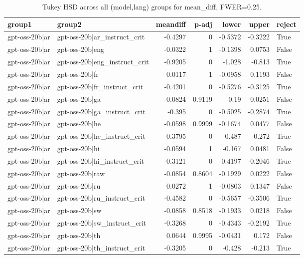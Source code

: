 \begin{table}
\caption{Tukey HSD across all (model,lang) groups for mean_diff, FWER=0.25.}
\label{tab:tukey_all_models_all_langs_mean_diff}
\begin{tabular}{l l r r r r l}
\toprule
group1 & group2 & meandiff & p-adj & lower & upper & reject \\
\midrule
gpt-oss-20b|ar & gpt-oss-20b|ar_instruct_crit & -0.4297 & 0 & -0.5372 & -0.3222 & True \\
gpt-oss-20b|ar & gpt-oss-20b|eng & -0.0322 & 1 & -0.1398 & 0.0753 & False \\
gpt-oss-20b|ar & gpt-oss-20b|eng_instruct_crit & -0.9205 & 0 & -1.028 & -0.813 & True \\
gpt-oss-20b|ar & gpt-oss-20b|fr & 0.0117 & 1 & -0.0958 & 0.1193 & False \\
gpt-oss-20b|ar & gpt-oss-20b|fr_instruct_crit & -0.4201 & 0 & -0.5276 & -0.3125 & True \\
gpt-oss-20b|ar & gpt-oss-20b|ga & -0.0824 & 0.9119 & -0.19 & 0.0251 & False \\
gpt-oss-20b|ar & gpt-oss-20b|ga_instruct_crit & -0.395 & 0 & -0.5025 & -0.2874 & True \\
gpt-oss-20b|ar & gpt-oss-20b|he & -0.0598 & 0.9999 & -0.1674 & 0.0477 & False \\
gpt-oss-20b|ar & gpt-oss-20b|he_instruct_crit & -0.3795 & 0 & -0.487 & -0.272 & True \\
gpt-oss-20b|ar & gpt-oss-20b|hi & -0.0594 & 1 & -0.167 & 0.0481 & False \\
gpt-oss-20b|ar & gpt-oss-20b|hi_instruct_crit & -0.3121 & 0 & -0.4197 & -0.2046 & True \\
gpt-oss-20b|ar & gpt-oss-20b|raw & -0.0854 & 0.8604 & -0.1929 & 0.0222 & False \\
gpt-oss-20b|ar & gpt-oss-20b|ru & 0.0272 & 1 & -0.0803 & 0.1347 & False \\
gpt-oss-20b|ar & gpt-oss-20b|ru_instruct_crit & -0.4582 & 0 & -0.5657 & -0.3506 & True \\
gpt-oss-20b|ar & gpt-oss-20b|sw & -0.0858 & 0.8518 & -0.1933 & 0.0218 & False \\
gpt-oss-20b|ar & gpt-oss-20b|sw_instruct_crit & -0.3268 & 0 & -0.4343 & -0.2192 & True \\
gpt-oss-20b|ar & gpt-oss-20b|th & 0.0644 & 0.9995 & -0.0431 & 0.172 & False \\
gpt-oss-20b|ar & gpt-oss-20b|th_instruct_crit & -0.3205 & 0 & -0.428 & -0.213 & True \\

\end{tabular}
\end{table}
